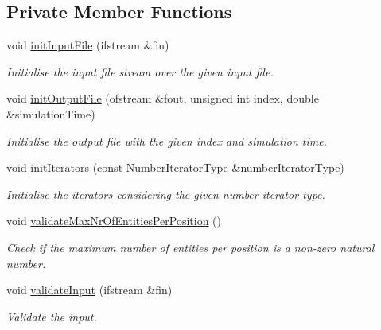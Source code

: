 \subsection*{Private Member Functions}
\begin{DoxyCompactItemize}
\item 
void \hyperlink{classmultiscale_1_1video_1_1RectangularEntityCsvToInputFilesConverter_a8b941e496ad19065d2bd0a3a1b21c47d}{init\-Input\-File} (ifstream \&fin)
\begin{DoxyCompactList}\small\item\em Initialise the input file stream over the given input file. \end{DoxyCompactList}\item 
void \hyperlink{classmultiscale_1_1video_1_1RectangularEntityCsvToInputFilesConverter_a08a817f0907a22cf7588ca43efa82ea7}{init\-Output\-File} (ofstream \&fout, unsigned int index, double \&simulation\-Time)
\begin{DoxyCompactList}\small\item\em Initialise the output file with the given index and simulation time. \end{DoxyCompactList}\item 
void \hyperlink{classmultiscale_1_1video_1_1RectangularEntityCsvToInputFilesConverter_a423a02139612b26846f17d24b50e4740}{init\-Iterators} (const \hyperlink{namespacemultiscale_a6ef911f4d48a4bf5e657c237ec169ff5}{Number\-Iterator\-Type} \&number\-Iterator\-Type)
\begin{DoxyCompactList}\small\item\em Initialise the iterators considering the given number iterator type. \end{DoxyCompactList}\item 
void \hyperlink{classmultiscale_1_1video_1_1RectangularEntityCsvToInputFilesConverter_ad5ab0bd1650a0e381cc155c0f97e2493}{validate\-Max\-Nr\-Of\-Entities\-Per\-Position} ()
\begin{DoxyCompactList}\small\item\em Check if the maximum number of entities per position is a non-\/zero natural number. \end{DoxyCompactList}\item 
void \hyperlink{classmultiscale_1_1video_1_1RectangularEntityCsvToInputFilesConverter_a0726af8634c9553cd90921d00e4a9b91}{validate\-Input} (ifstream \&fin)
\begin{DoxyCompactList}\small\item\em Validate the input. \end{DoxyCompactList}\item 

\end{DoxyCompactItemize}
